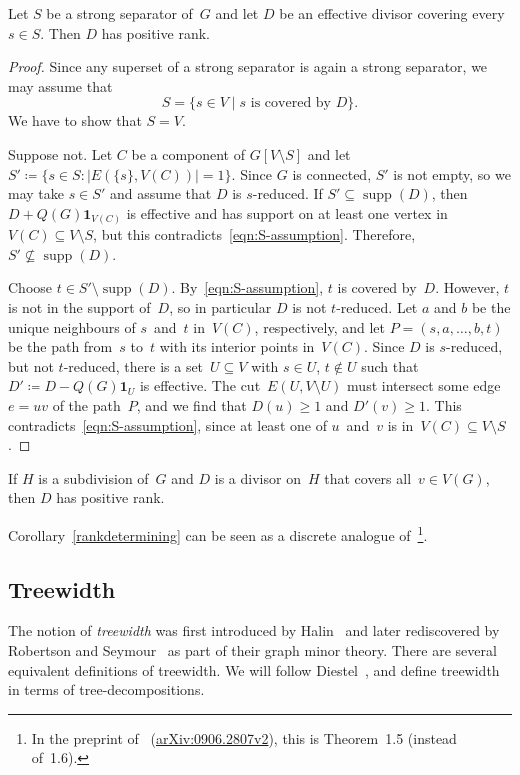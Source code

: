 \documentclass[ALCO,ThmDefs,Unicode,epreuves]{cedram}
\newcommand{\one}{\ensuremath{\mathbf{1}}}
\DeclareMathOperator{\supp}{supp}
\begin{document}
\begin{lemma}\label{Luotype}
Let $S$ be a strong separator of~$G$ and let $D$ be an effective divisor covering every~$s\in S$. Then $D$ has positive rank. 
\end{lemma}
\begin{proof}
Since any superset of a strong separator is again a strong separator, we may assume that
\begin{equation}
	S=\{s\in V\mid \text{$s$ is covered by $D$}\}. \label{eqn:S-assumption}
\end{equation}
We have to show that $S=V$. 

Suppose not. Let $C$ be a component of $G[V\setminus S]$ and let $S'\coloneqq \{s\in S: |E(\{s\},V(C))|=1\}$. Since $G$ is connected, $S'$ is not empty, so we may take $s\in S'$ and assume that $D$ is $s$-reduced. If $S'\subseteq \supp(D)$, then $D+Q(G)\one_{V(C)}$ is effective and has support on at least one vertex in $V(C)\subseteq V\setminus S$, but this contradicts~\eqref{eqn:S-assumption}. Therefore, $S' \not\subseteq \supp(D)$. 

Choose $t\in S'\setminus \supp(D)$. By~\eqref{eqn:S-assumption}, $t$ is covered by~$D$. However, $t$ is not in the support of~$D$, so in particular $D$ is not $t$-reduced. Let $a$ and $b$ be the unique neighbours of $s$~and~$t$ in~$V(C)$, respectively, and let $P=(s,a,\ldots,b,t)$ be the path from~$s$ to~$t$ with its interior points in~$V(C)$. Since $D$ is $s$-reduced, but not $t$-reduced, there is a set~$U\subseteq V$ with $s\in U$, $t\not\in U$ such that $D'\coloneqq D-Q(G)\one_U$ is effective. The cut~$E(U,V\setminus U)$ must intersect some edge~$e=uv$ of the path~$P$, and we find that $D(u)\geq 1$ and $D'(v)\geq 1$. This contradicts~\eqref{eqn:S-assumption}, since at least one of $u$~and~$v$ is in~$V(C)\subseteq V\setminus S$.
\end{proof}

\begin{coro}
\label{rankdetermining}
If $H$ is a subdivision of~$G$ and $D$ is a divisor on~$H$ that covers all~$v\in V(G)$, then $D$ has positive rank.
\end{coro}

Corollary~\ref{rankdetermining} can be seen as a discrete analogue of~\cite[Theorem~1.6]{Luo2011}\footnote{In the preprint of~\cite{Luo2011} (\cf \href{https://arxiv.org/abs/0906.2807v2}{arXiv:0906.2807v2}), this is Theorem~1.5 (instead of~1.6).}.

\subsection{Treewidth}
The notion of \emph{treewidth} was first introduced by Halin~\cite{Halin1976} and later rediscovered by Robertson and Seymour~\cite{RobertsonSeymour1990} as part of their graph minor theory. There are several equivalent definitions of treewidth. We will follow Diestel~\cite{DiestelGraphTheory}, and define treewidth in terms of tree-decompositions.
\end{document}
